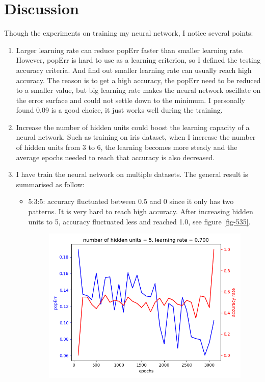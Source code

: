 \documentclass[11pt]{article}
\begin{document}
\section{Discussion}
\label{sec-4}
Though the experiments on training my neural network, I notice several points:
\begin{enumerate}
\item Larger learning rate can reduce popErr faster than smaller learning rate. However, popErr is hard to use as a learning criterion, so I defined the testing accuracy criteria. And find out smaller learning rate can usually reach high accuracy. The reason is to get a high accuracy, the popErr need to be reduced to a smaller value, but big learning rate makes the neural network oscillate on the error surface and could not settle down to the minimum. I personally found 0.09 is a good choice, it just works well during the training.
\item Increase the number of hidden units could boost the learning capacity of a neural network. Such as training on iris dataset, when I increase the number of hidden units from 3 to 6, the learning becomes more steady and the average epochs needed to reach that accuracy is also decreased.
\item I have train the neural network on multiple datasets. The general result is summarised as follow:
\begin{itemize}
\item 5:3:5: accuracy fluctuated between 0.5 and 0 since it only has two patterns. It is very hard to reach high accuracy. After increasing hidden units to 5, accuracy fluctuated less and reached 1.0, see figure \ref{fig-535}.
\begin{figure}[htb]
\centering
\includegraphics[width=.9\linewidth]{./popErr_vs_accuracy_on_535.png}

\end{figure}
\end{itemize}
\end{enumerate}
\end{document}
